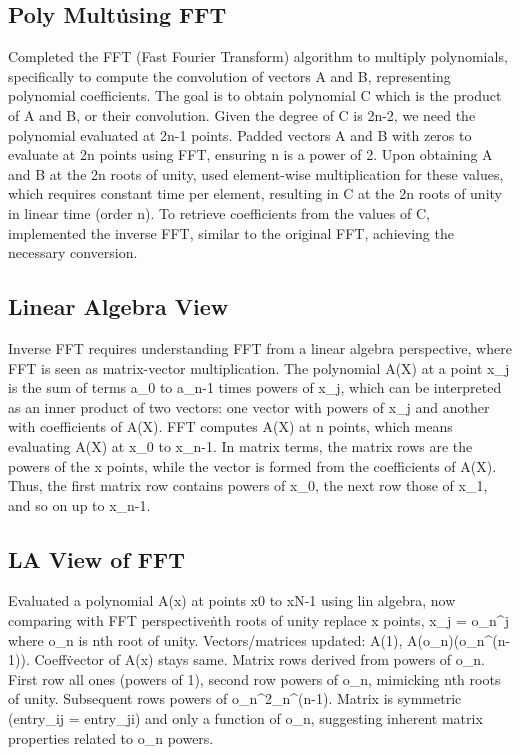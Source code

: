 \subsection*{Poly Mult\. using FFT}
Completed the FFT (Fast Fourier Transform) algorithm to multiply polynomials, specifically to compute the convolution of vectors A and B, representing polynomial coefficients.
The goal is to obtain polynomial C which is the product of A and B, or their convolution.
Given the degree of C is 2n-2, we need the polynomial evaluated at 2n-1 points.
Padded vectors A and B with zeros to evaluate at 2n points using FFT, ensuring n is a power of 2.
Upon obtaining A and B at the 2n roots of unity, used element-wise multiplication for these values, which requires constant time per element, resulting in C at the 2n roots of unity in linear time (order n).
To retrieve coefficients from the values of C, implemented the inverse FFT, similar to the original FFT, achieving the necessary conversion.

\subsection*{Linear Algebra View}
Inverse FFT requires understanding FFT from a linear algebra perspective, where FFT is seen as matrix-vector multiplication.
The polynomial A(X) at a point x\_j is the sum of terms a\_0 to a\_n-1 times powers of x\_j, which can be interpreted as an inner product of two vectors: one vector with powers of x\_j and another with coefficients of A(X).
FFT computes A(X) at n points, which means evaluating A(X) at x\_0 to x\_n-1.
In matrix terms, the matrix rows are the powers of the x points, while the vector is formed from the coefficients of A(X).
Thus, the first matrix row contains powers of x\_0, the next row those of x\_1, and so on up to x\_n-1.

\subsection*{LA View of FFT}
Evaluated a polynomial A(x) at points x0 to xN-1 using lin algebra, now comparing with FFT perspective\. nth roots of unity replace x points, x\_j = o\_n\textasciicircum{}j where o\_n is nth root of unity.
Vectors/matrices updated: A(1), A(o\_n)\ldotsA(o\_n\textasciicircum{}(n-1)).
Coeff\. vector of A(x) stays same.
Matrix rows derived from powers of o\_n.
First row all ones (powers of 1), second row powers of o\_n, mimicking nth roots of unity.
Subsequent rows powers of o\_n\textasciicircum{}2\ldotso\_n\textasciicircum{}(n-1).
Matrix is symmetric (entry\_ij = entry\_ji) and only a function of o\_n, suggesting inherent matrix properties related to o\_n powers.

